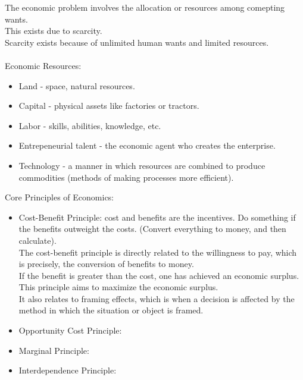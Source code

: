 \documentclass[nobib]{tufte-handout}
\begin{document}
\quad The economic problem involves the allocation or resources among comepting wants.\\
\quad This exists due to scarcity.\\
\quad Scarcity exists because of unlimited human wants and limited resources.\\~\\
Economic Resources:\\
\begin{itemize}
    \item Land - space, natural resources.
    \item Capital - physical assets like factories or tractors.
    \item Labor - skills, abilities, knowledge, etc.
    \item Entrepeneurial talent - the economic agent who creates the enterprise.
    \item Technology - a manner in which resources are combined to produce commodities
          (methods of making processes more efficient).
\end{itemize}
Core Principles of Economics:
\begin{itemize}
    \item Cost-Benefit Principle: cost and benefits are the incentives. Do something if
          the benefits outweight the costs. (Convert everything to money, and then
          calculate).\\ The cost-benefit principle is directly related to the willingness
          to pay, which is precisely, the conversion of benefits to money.\\ If the
          benefit is greater than the cost, one has achieved an economic surplus. This
          principle aims to maximize the economic surplus.\\ It also relates to framing
          effects, which is when a decision is affected by the method in which the
          situation or object is framed.
    \item Opportunity Cost Principle:
    \item Marginal Principle:
    \item Interdependence Principle:
\end{itemize}
\end{document}
